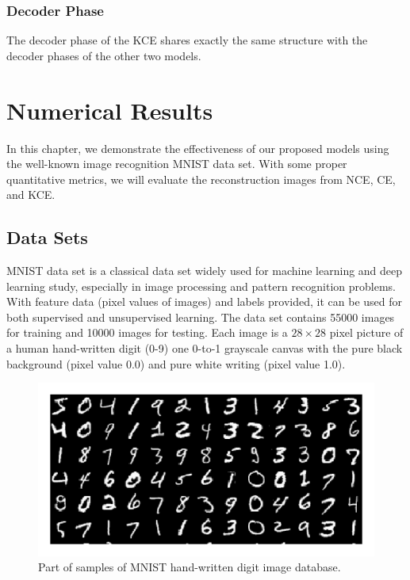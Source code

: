 \documentclass[12pt]{report} %
\begin{document}
\subsection{Decoder Phase}
The decoder phase of the KCE shares exactly the same structure with the decoder phases of the other two models. 

\chapter{Numerical Results}
In this chapter, we demonstrate the effectiveness of our proposed models using the well-known image recognition MNIST data set. With some proper quantitative metrics, we will evaluate the reconstruction images from NCE, CE, and KCE. 
\section{Data Sets}
MNIST data set\cite{MNIST} is a classical data set widely used for machine learning and deep learning study, especially in image processing and pattern recognition problems. With feature data (pixel values of images) and labels provided, it can be used for both supervised and unsupervised learning. The data set contains 55000 images for training and 10000 images for testing. Each image is a $28 \times 28$ pixel picture of a human hand-written digit (0-9) one 0-to-1 grayscale canvas with the pure black background (pixel value 0.0) and pure white writing (pixel value 1.0).
\begin{figure}[H]
	\centering
	\includegraphics[scale=2.0]{pictures/MNIST.png}
	\caption{Part of samples of MNIST hand-written digit image database\cite{MNISTPIC}.}
	\label{fig:1}
\end{figure}
\end{document}
